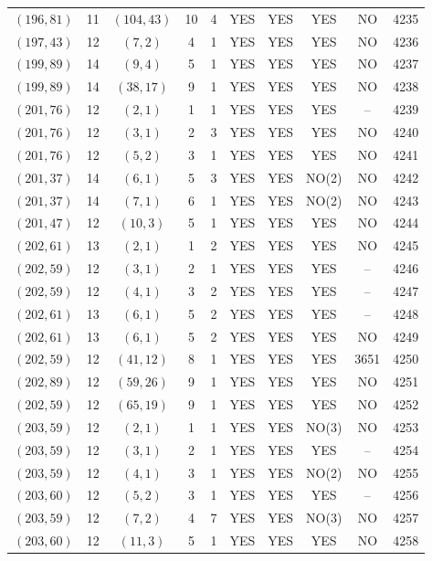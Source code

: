 \begin{longtable}{|c|c|c|c|c|c|c|c|c|c|}
$(196, 81)$ & 11 & $(104, 43)$ & 10 & 4 & YES & YES & YES & NO & 4235\\
$(197, 43)$ & 12 & $(7, 2)$ & 4 & 1 & YES & YES & YES & NO & 4236\\
$(199, 89)$ & 14 & $(9, 4)$ & 5 & 1 & YES & YES & YES & NO & 4237\\
$(199, 89)$ & 14 & $(38, 17)$ & 9 & 1 & YES & YES & YES & NO & 4238\\
$(201, 76)$ & 12 & $(2, 1)$ & 1 & 1 & YES & YES & YES & -- & 4239\\
$(201, 76)$ & 12 & $(3, 1)$ & 2 & 3 & YES & YES & YES & NO & 4240\\
$(201, 76)$ & 12 & $(5, 2)$ & 3 & 1 & YES & YES & YES & NO & 4241\\
$(201, 37)$ & 14 & $(6, 1)$ & 5 & 3 & YES & YES & NO(2) & NO & 4242\\
$(201, 37)$ & 14 & $(7, 1)$ & 6 & 1 & YES & YES & NO(2) & NO & 4243\\
$(201, 47)$ & 12 & $(10, 3)$ & 5 & 1 & YES & YES & YES & NO & 4244\\
$(202, 61)$ & 13 & $(2, 1)$ & 1 & 2 & YES & YES & YES & NO & 4245\\
$(202, 59)$ & 12 & $(3, 1)$ & 2 & 1 & YES & YES & YES & -- & 4246\\
$(202, 59)$ & 12 & $(4, 1)$ & 3 & 2 & YES & YES & YES & -- & 4247\\
$(202, 61)$ & 13 & $(6, 1)$ & 5 & 2 & YES & YES & YES & -- & 4248\\
$(202, 61)$ & 13 & $(6, 1)$ & 5 & 2 & YES & YES & YES & NO & 4249\\
$(202, 59)$ & 12 & $(41, 12)$ & 8 & 1 & YES & YES & YES & 3651 & 4250\\
$(202, 89)$ & 12 & $(59, 26)$ & 9 & 1 & YES & YES & YES & NO & 4251\\
$(202, 59)$ & 12 & $(65, 19)$ & 9 & 1 & YES & YES & YES & NO & 4252\\
$(203, 59)$ & 12 & $(2, 1)$ & 1 & 1 & YES & YES & NO(3) & NO & 4253\\
$(203, 59)$ & 12 & $(3, 1)$ & 2 & 1 & YES & YES & YES & -- & 4254\\
$(203, 59)$ & 12 & $(4, 1)$ & 3 & 1 & YES & YES & NO(2) & NO & 4255\\
$(203, 60)$ & 12 & $(5, 2)$ & 3 & 1 & YES & YES & YES & -- & 4256\\
$(203, 59)$ & 12 & $(7, 2)$ & 4 & 7 & YES & YES & NO(3) & NO & 4257\\
$(203, 60)$ & 12 & $(11, 3)$ & 5 & 1 & YES & YES & YES & NO & 4258\\

\end{longtable}
